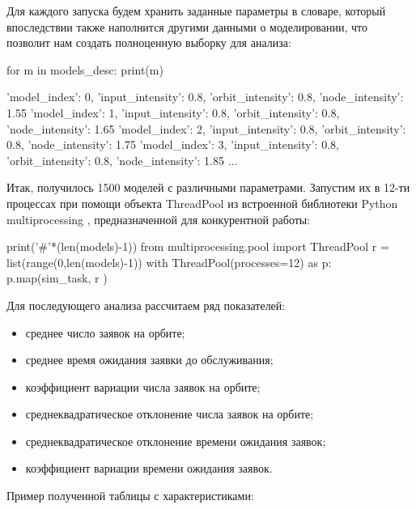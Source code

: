 Для каждого запуска будем хранить заданные параметры в словаре, который впоследствии также наполнится другими данными о моделировании, что позволит нам создать полноценную выборку для анализа:

\begin{pyin}
for m in models_desc:
   print(m)
\end{pyin}

\begin{pyprint}
{'model_index': 0, 'input_intensity': 0.8, 'orbit_intensity': 0.8, 'node_intensity': 1.55}
{'model_index': 1, 'input_intensity': 0.8, 'orbit_intensity': 0.8, 'node_intensity': 1.65}
{'model_index': 2, 'input_intensity': 0.8, 'orbit_intensity': 0.8, 'node_intensity': 1.75}
{'model_index': 3, 'input_intensity': 0.8, 'orbit_intensity': 0.8, 'node_intensity': 1.85}
...
\end{pyprint}

Итак, получилось 1500 моделей с различными параметрами. Запустим их в 12-ти процессах при помощи объекта ThreadPool из встроенной библиотеки Python multiprocessing \cite{multiproc}, предназначенной для конкурентной работы:
\begin{pyin}
print('#'*(len(models)-1))
from multiprocessing.pool import ThreadPool
r = list(range(0,len(models)-1))
with  ThreadPool(processes=12) as p:
   p.map(sim_task, r )
\end{pyin}

Для последующего анализа рассчитаем ряд показателей:
\begin{itemize}
	\item среднее число заявок на орбите;
	\item среднее время ожидания заявки до обслуживания;
	\item коэффициент вариации числа заявок на орбите;
	\item среднеквадратическое отклонение числа заявок на орбите;
	\item среднеквадратическое отклонение времени ожидания заявок;
	\item коэффициент вариации времени ожидания заявок.
\end{itemize}

Пример полученной таблицы с характеристиками:

